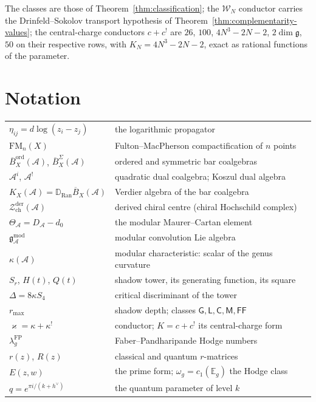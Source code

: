 \documentclass[11pt]{amsart}
\numberwithin{equation}{section}
\theoremstyle{plain}
\theoremstyle{definition}
\theoremstyle{remark}
\newcommand{\cA}{\mathcal{A}}
\newcommand{\cW}{\mathcal{W}}
\newcommand{\cZ}{\mathcal{Z}}
\newcommand{\fg}{\mathfrak{g}}
\newcommand{\gmod}{\mathfrak{g}^{\mathrm{mod}}}
\newcommand{\Ran}{\mathrm{Ran}}
\newcommand{\FM}{\mathrm{FM}}
\newcommand{\barB}{\overline{B}}
\newcommand{\dvee}{h^{\vee}}
\newcommand{\bE}{\mathbb{E}}
\begin{document}
\medskip
\noindent
The classes are those of Theorem~\ref{thm:classification}; the
$\cW_N$ conductor carries the Drinfeld--Sokolov transport hypothesis of
Theorem~\ref{thm:complementarity-values}; the central-charge
conductors $c+c^{!}$ are $26$, $100$, $4N^{3}-2N-2$, $2\dim\fg$, $50$
on their respective rows, with $K_N=4N^{3}-2N-2$, exact as rational
functions of the parameter.

\section{Notation}\label{app:notation}

\begin{center}
\begin{tabular}{ll}
$\eta_{ij}=d\log(z_i-z_j)$ & the logarithmic propagator\\
$\FM_n(X)$ & Fulton--MacPherson compactification of $n$ points\\
$\barB^{\mathrm{ord}}_X(\cA)$, $\barB^{\Sigma}_X(\cA)$ &
ordered and symmetric bar coalgebras\\
$\cA^{i}$, $\cA^{!}$ & quadratic dual coalgebra; Koszul dual algebra\\
$K_X(\cA)=\mathbb{D}_{\Ran}\barB_X(\cA)$ & Verdier algebra of the bar
coalgebra\\
$\cZ^{\mathrm{der}}_{\mathrm{ch}}(\cA)$ & derived chiral centre
(chiral Hochschild complex)\\
$\Theta_{\cA}=D_{\cA}-d_0$ & the modular Maurer--Cartan element\\
$\gmod_{\cA}$ & modular convolution Lie algebra\\
$\kappa(\cA)$ & modular characteristic: scalar of the genus curvature\\
$S_r$, $H(t)$, $Q(t)$ & shadow tower, its generating function, its
square\\
$\Delta=8\kappa S_4$ & critical discriminant of the tower\\
$r_{\max}$ & shadow depth; classes $\mathsf{G},\mathsf{L},
\mathsf{C},\mathsf{M},\mathsf{FF}$\\
$\varkappa=\kappa+\kappa^{!}$ & conductor; $K=c+c^{!}$ its
central-charge form\\
$\lambda_g^{\mathrm{FP}}$ & Faber--Pandharipande Hodge numbers\\
$r(z)$, $R(z)$ & classical and quantum $r$-matrices\\
$E(z,w)$ & the prime form; $\omega_g=c_1(\bE_g)$ the Hodge class\\
$q=e^{\pi i/(k+\dvee)}$ & the quantum parameter of level $k$
\end{tabular}
\end{center}
\end{document}
